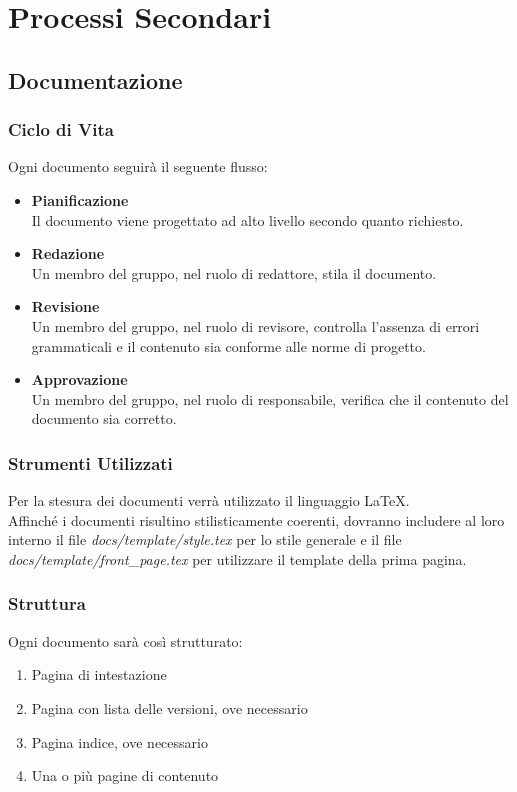 \documentclass[a4paper, 12pt]{article}
\begin{document}
\section{Processi Secondari}
\subsection{Documentazione}
\subsubsection{Ciclo di Vita}
Ogni documento seguirà il seguente flusso:
\begin{itemize}
    \item \textbf{Pianificazione} \\ Il documento viene progettato ad alto livello secondo quanto richiesto.
    \item \textbf{Redazione} \\ Un membro del gruppo, nel ruolo di redattore, stila il documento.
    \item \textbf{Revisione} \\ Un membro del gruppo, nel ruolo di revisore, controlla l'assenza di errori grammaticali e il contenuto sia conforme alle norme di progetto.
    \item \textbf{Approvazione} \\ Un membro del gruppo, nel ruolo di responsabile, verifica che il contenuto del documento sia corretto.
\end{itemize}

\subsubsection{Strumenti Utilizzati}
Per la stesura dei documenti verrà utilizzato il linguaggio \LaTeX. \\
Affinché i documenti risultino stilisticamente coerenti, dovranno includere al loro interno il file \textit{docs/template/style.tex} per lo stile generale e il file \textit{docs/template/front\_page.tex} per utilizzare il template della prima pagina.

\subsubsection{Struttura}
Ogni documento sarà così strutturato:
\begin{enumerate}
    \item Pagina di intestazione
    \item Pagina con lista delle versioni, ove necessario
    \item Pagina indice, ove necessario
    \item Una o più pagine di contenuto
\end{enumerate}
\end{document}
